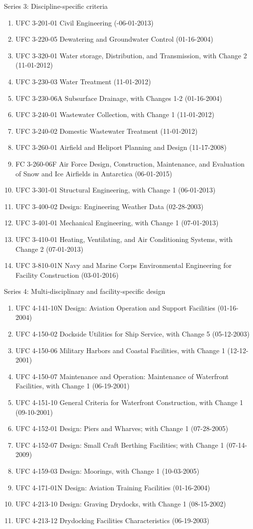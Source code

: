 \documentclass[10pt]{amsart}
\begin{document}
Series 3: Discipline-specific criteria
\begin{enumerate}
\item UFC 3-201-01 Civil Engineering (-06-01-2013)
\item UFC 3-220-05 Dewatering and Groundwater Control (01-16-2004)
\item UFC 3-320-01 Water storage, Distribution, and Transmission, with Change 2 (11-01-2012)
\item UFC 3-230-03 Water Treatment (11-01-2012)
\item UFC 3-230-06A Subsurface Drainage, with Changes 1-2 (01-16-2004)
\item UFC 3-240-01 Wastewater Collection, with Change 1 (11-01-2012)
\item UFC 3-240-02 Domestic Wastewater Treatment (11-01-2012)
\item UFC 3-260-01 Airfield and Heliport Planning and Design (11-17-2008)
\item FC 3-260-06F Air Force Design, Construction, Maintenance, and Evaluation of Snow and Ice Airfields in Antarctica (06-01-2015)
\item UFC 3-301-01 Structural Engineering, with Change 1 (06-01-2013)
\item UFC 3-400-02 Design: Engineering Weather Data (02-28-2003)
\item UFC 3-401-01 Mechanical Engineering, with Change 1 (07-01-2013)
\item UFC 3-410-01 Heating, Ventilating, and Air Conditioning Systems, with Change 2 (07-01-2013)
\item UFC 3-810-01N Navy and Marine Corps Environmental Engineering for Facility Construction (03-01-2016)
\end{enumerate}

Series 4: Multi-disciplinary and facility-specific design
\begin{enumerate}
\item UFC 4-141-10N Design: Aviation Operation and Support Facilities (01-16-2004)
\item UFC 4-150-02 Dockside Utilities for Ship Service, with Change 5 (05-12-2003)
\item UFC 4-150-06 Military Harbors and Coastal Facilities, with Change 1 (12-12-2001)
\item UFC 4-150-07 Maintenance and Operation: Maintenance of Waterfront Facilities, with Change 1 (06-19-2001)
\item UFC 4-151-10 General Criteria for Waterfront Construction, with Change 1 (09-10-2001) 	
\item UFC 4-152-01 Design: Piers and Wharves; with Change 1 (07-28-2005)
\item UFC 4-152-07 Design: Small Craft Berthing Facilities; with Change 1 (07-14-2009)
\item UFC 4-159-03 Design: Moorings, with Change 1 (10-03-2005)
\item UFC 4-171-01N Design: Aviation Training Facilities (01-16-2004)
\item UFC 4-213-10 Design: Graving Drydocks, with Change 1 (08-15-2002)
\item UFC 4-213-12 Drydocking Facilities Characteristics (06-19-2003)
\end{enumerate}
\end{document}

